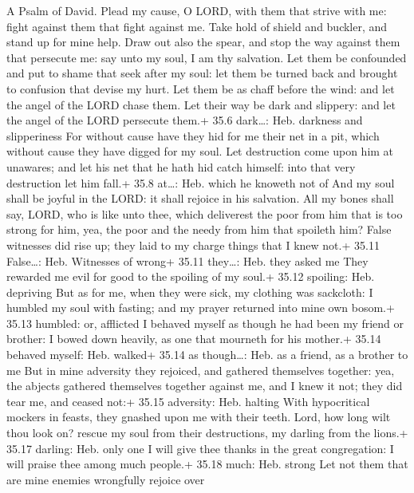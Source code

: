 A Psalm of David.  Plead my cause, O LORD, with them that
strive with me: fight against them that fight against me. 
Take hold of shield and buckler, and stand up for mine help.
 Draw out also the spear, and stop the way against them that
persecute me: say unto my soul, I am thy salvation.  Let
them be confounded and put to shame that seek after my soul: let them be
turned back and brought to confusion that devise my hurt. 
Let them be as chaff before the wind: and let the angel of the LORD
chase them.  Let their way be dark and slippery: and let the
angel of the LORD persecute them.+ 35.6 dark\ldots: Heb. darkness and
slipperiness  For without cause have they hid for me their
net in a pit, which without cause they have digged for my soul.
 Let destruction come upon him at unawares; and let his net
that he hath hid catch himself: into that very destruction let him
fall.+ 35.8 at\ldots: Heb. which he knoweth not of  And my
soul shall be joyful in the LORD: it shall rejoice in his salvation.
 All my bones shall say, LORD, who is like unto thee, which
deliverest the poor from him that is too strong for him, yea, the poor
and the needy from him that spoileth him?  False witnesses
did rise up; they laid to my charge things that I knew not.+ 35.11
False\ldots: Heb. Witnesses of wrong+ 35.11 they\ldots: Heb. they asked
me  They rewarded me evil for good to the spoiling of my
soul.+ 35.12 spoiling: Heb. depriving  But as for me, when
they were sick, my clothing was sackcloth: I humbled my soul with
fasting; and my prayer returned into mine own bosom.+ 35.13 humbled: or,
afflicted  I behaved myself as though he had been my friend
or brother: I bowed down heavily, as one that mourneth for his mother.+
35.14 behaved myself: Heb. walked+ 35.14 as though\ldots: Heb. as a
friend, as a brother to me  But in mine adversity they
rejoiced, and gathered themselves together: yea, the abjects gathered
themselves together against me, and I knew it not; they did tear me, and
ceased not:+ 35.15 adversity: Heb. halting  With
hypocritical mockers in feasts, they gnashed upon me with their teeth.
 Lord, how long wilt thou look on? rescue my soul from
their destructions, my darling from the lions.+ 35.17 darling: Heb. only
one  I will give thee thanks in the great congregation: I
will praise thee among much people.+ 35.18 much: Heb. strong
 Let not them that are mine enemies wrongfully rejoice over
